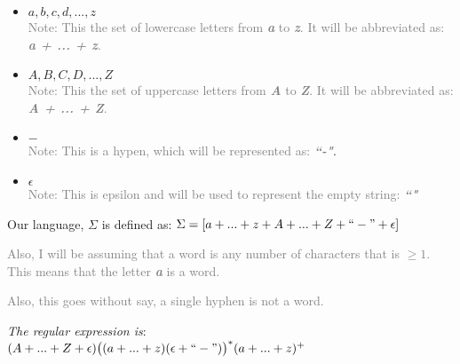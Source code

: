 \documentclass[11pt,fleqn]{article}
\begin{document}
  \begin{itemize}

    \item{$a, b, c, d, ..., z$}
    \\ \textcolor{gray}{Note: This the set of lowercase letters from \textit{\textbf{a}} to \textit{\textbf{z}}. It will be abbreviated as: \textit{\textbf{a + ... + z}}.}

    \item{$A, B, C, D, ..., Z$}
    \\ \textcolor{gray}{Note: This the set of uppercase letters from \textit{\textbf{A}} to \textit{\textbf{Z}}. It will be abbreviated as: \textit{\textbf{A + ... + Z}}.}

    \item{$-$}
    \\ \textcolor{gray}{Note: This is a hypen, which will be represented as: \textit{\textbf{``-"}}}.

    \item{$\epsilon$}
    \\ \textcolor{gray}{Note: This is epsilon and will be used to represent the empty string: \textit{\textbf{``"}}}

  \end{itemize}

  Our language, $\Sigma$ is defined as: $\Sigma = [a + ... + z + A + ... + Z + ``-" + \epsilon]$

  \textcolor{gray}{Also, I will be assuming that a word is any number of characters that is $\geq 1$. This means that the letter \textbf{\textit{a}} is a word.}

  \textcolor{gray}{Also, this goes without say, a single hyphen is not a word.}

  \textit{The regular expression is}: \\ 
  $(A + ... + Z + \epsilon)\big((a + ... + z)(\epsilon + ``-")\big)^*(a + ... + z)^+$



\end{document}
